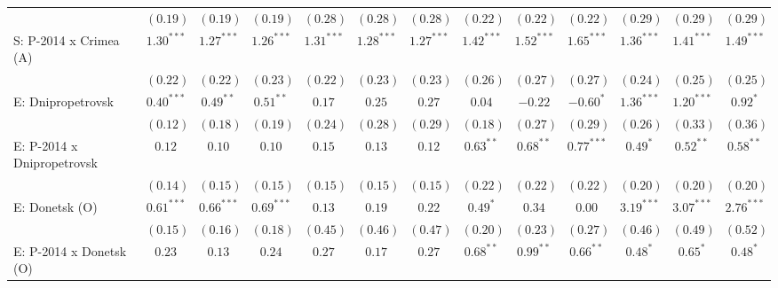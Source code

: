\begin{table}
\begin{center}
\begin{tiny}
\begin{tabular}{l c c c c c c c c c c c c}
                            & $(0.19)$      & $(0.19)$      & $(0.19)$      & $(0.28)$     & $(0.28)$     & $(0.28)$     & $(0.22)$      & $(0.22)$     & $(0.22)$       & $(0.29)$      & $(0.29)$      & $(0.29)$      \\
S: P-2014 x Crimea (A)      & $1.30^{***}$  & $1.27^{***}$  & $1.26^{***}$  & $1.31^{***}$ & $1.28^{***}$ & $1.27^{***}$ & $1.42^{***}$  & $1.52^{***}$ & $1.65^{***}$   & $1.36^{***}$  & $1.41^{***}$  & $1.49^{***}$  \\
                            & $(0.22)$      & $(0.22)$      & $(0.23)$      & $(0.22)$     & $(0.23)$     & $(0.23)$     & $(0.26)$      & $(0.27)$     & $(0.27)$       & $(0.24)$      & $(0.25)$      & $(0.25)$      \\
E: Dnipropetrovsk           & $0.40^{***}$  & $0.49^{**}$   & $0.51^{**}$   & $0.17$       & $0.25$       & $0.27$       & $0.04$        & $-0.22$      & $-0.60^{*}$    & $1.36^{***}$  & $1.20^{***}$  & $0.92^{*}$    \\
                            & $(0.12)$      & $(0.18)$      & $(0.19)$      & $(0.24)$     & $(0.28)$     & $(0.29)$     & $(0.18)$      & $(0.27)$     & $(0.29)$       & $(0.26)$      & $(0.33)$      & $(0.36)$      \\
E: P-2014 x Dnipropetrovsk  & $0.12$        & $0.10$        & $0.10$        & $0.15$       & $0.13$       & $0.12$       & $0.63^{**}$   & $0.68^{**}$  & $0.77^{***}$   & $0.49^{*}$    & $0.52^{**}$   & $0.58^{**}$   \\
                            & $(0.14)$      & $(0.15)$      & $(0.15)$      & $(0.15)$     & $(0.15)$     & $(0.15)$     & $(0.22)$      & $(0.22)$     & $(0.22)$       & $(0.20)$      & $(0.20)$      & $(0.20)$      \\
E: Donetsk (O)              & $0.61^{***}$  & $0.66^{***}$  & $0.69^{***}$  & $0.13$       & $0.19$       & $0.22$       & $0.49^{*}$    & $0.34$       & $0.00$         & $3.19^{***}$  & $3.07^{***}$  & $2.76^{***}$  \\
                            & $(0.15)$      & $(0.16)$      & $(0.18)$      & $(0.45)$     & $(0.46)$     & $(0.47)$     & $(0.20)$      & $(0.23)$     & $(0.27)$       & $(0.46)$      & $(0.49)$      & $(0.52)$      \\
E: P-2014 x Donetsk (O)     & $0.23$        & $0.13$        & $0.24$        & $0.27$       & $0.17$       & $0.27$       & $0.68^{**}$   & $0.99^{**}$  & $0.66^{**}$    & $0.48^{*}$    & $0.65^{*}$    & $0.48^{*}$    \\

\end{tabular}
\end{tiny}
\end{center}
\end{table}
